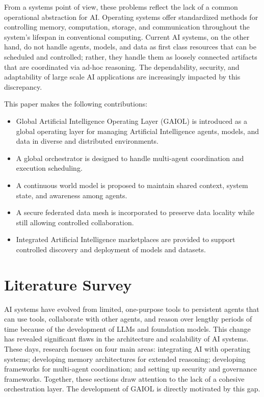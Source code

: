 \documentclass[final,5p,times,twocolumn,authoryear,draft]{elsarticle}
\begin{document}
From a systems point of view, these problems reflect the lack of a common operational abstraction for AI. Operating systems offer standardized methods for controlling memory, computation, storage, and communication throughout the system's lifespan in conventional computing. Current AI systems, on the other hand, do not handle agents, models, and data as first class resources that can be scheduled and controlled; rather, they handle them as loosely connected artifacts that are coordinated via ad-hoc reasoning. The dependability, security, and adaptability of large scale AI applications are increasingly impacted by this discrepancy.

This paper makes the following contributions:
\begin{itemize}
    \item  Global Artificial Intelligence Operating Layer (GAIOL) is introduced as a global operating layer for managing Artificial Intelligence agents, models, and data in diverse and distributed environments.
    \item A global orchestrator is designed to handle multi-agent coordination and execution scheduling.
    \item A continuous world model is proposed to maintain shared context, system state, and awareness among agents.
    \item A secure federated data mesh is incorporated to preserve data locality while still allowing controlled collaboration.
    \item  Integrated Artificial Intelligence marketplaces are provided to support controlled discovery and deployment of models and datasets.
\end{itemize}

\section{Literature Survey}

AI systems have evolved from limited, one-purpose tools to persistent agents that can use tools, collaborate with other agents, and reason over lengthy periods of time because of the development of LLMs and foundation models. This change has revealed significant flaws in the architecture and scalability of AI systems. These days, research focuses on four main areas: integrating AI with operating systems; developing memory architectures for extended reasoning; developing frameworks for multi-agent coordination; and setting up security and governance frameworks. Together, these sections draw attention to the lack of a cohesive orchestration layer. The development of GAIOL is directly motivated by this gap.
\end{document}
